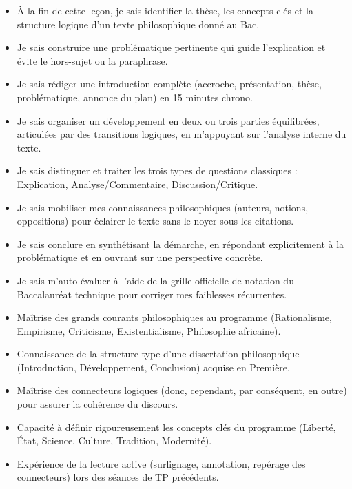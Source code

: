 \documentclass[11pt]{article}
\begin{document}
\begin{objectifs}
\begin{itemize}
\item À la fin de cette leçon, je sais identifier la thèse, les concepts clés et la structure logique d'un texte philosophique donné au Bac.
\item Je sais construire une problématique pertinente qui guide l'explication et évite le hors-sujet ou la paraphrase.
\item Je sais rédiger une introduction complète (accroche, présentation, thèse, problématique, annonce du plan) en 15 minutes chrono.
\item Je sais organiser un développement en deux ou trois parties équilibrées, articulées par des transitions logiques, en m'appuyant sur l'analyse interne du texte.
\item Je sais distinguer et traiter les trois types de questions classiques : Explication, Analyse/Commentaire, Discussion/Critique.
\item Je sais mobiliser mes connaissances philosophiques (auteurs, notions, oppositions) pour éclairer le texte sans le noyer sous les citations.
\item Je sais conclure en synthétisant la démarche, en répondant explicitement à la problématique et en ouvrant sur une perspective concrète.
\item Je sais m'auto-évaluer à l'aide de la grille officielle de notation du Baccalauréat technique pour corriger mes faiblesses récurrentes.
\end{itemize}
\end{objectifs}

\begin{prerequis}
\begin{itemize}
\item Maîtrise des grands courants philosophiques au programme (Rationalisme, Empirisme, Criticisme, Existentialisme, Philosophie africaine).
\item Connaissance de la structure type d'une dissertation philosophique (Introduction, Développement, Conclusion) acquise en Première.
\item Maîtrise des connecteurs logiques (donc, cependant, par conséquent, en outre) pour assurer la cohérence du discours.
\item Capacité à définir rigoureusement les concepts clés du programme (Liberté, État, Science, Culture, Tradition, Modernité).
\item Expérience de la lecture active (surlignage, annotation, repérage des connecteurs) lors des séances de TP précédents.
\end{itemize}
\end{prerequis}
\end{document}
